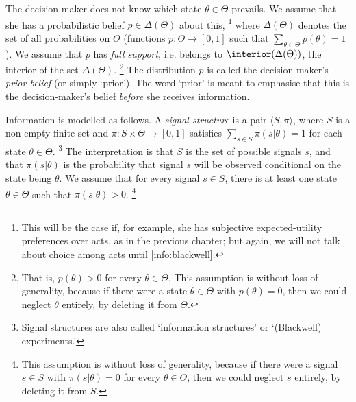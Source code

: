 The decision-maker does not know which state $\theta \in \Theta$ prevails. We assume that she has a probabilistic belief $p \in \Delta(\Theta)$ about this,%
	\footnote{This will be the case if, for example, she has subjective expected-utility preferences over acts, as in the previous chapter; but again, we will not talk about choice among acts until \cref{info:blackwell}.}
where $\Delta(\Theta)$ denotes the set of all probabilities on $\Theta$ (functions $p : \Theta \to [0,1]$ such that $\sum_{\theta \in \Theta} p(\theta) = 1$). We assume that $p$ has \emph{full support}, i.e. belongs to $\interior(\Delta(\Theta))$, the interior of the set $\Delta(\Theta)$.%
	\footnote{That is, $p(\theta)>0$ for every $\theta \in \Theta$. This assumption is without loss of generality, because if there were a state $\theta \in \Theta$ with $p(\theta)=0$, then we could neglect $\theta$ entirely, by deleting it from $\Theta$.}
The distribution $p$ is called the decision-maker's \emph{prior belief} (or simply `prior'). The word `prior' is meant to emphasise that this is the decision-maker's belief \emph{before} she receives information.

Information is modelled as follows. A \emph{signal structure} is a pair $\langle S, \pi \rangle $, where $S$ is a non-empty finite set and $\pi : S \times \Theta \to [0,1]$ satisfies $\sum_{s \in S} \pi(s|\theta) = 1$ for each state $\theta \in \Theta$.%
	\footnote{Signal structures are also called `information structures' or `(Blackwell) experiments.'}
The interpretation is that $S$ is the set of possible signals $s$, and that $\pi(s|\theta)$ is the probability that signal $s$ will be observed conditional on the state being $\theta$. We assume that for every signal $s \in S$, there is at least one state $\theta \in \Theta$ such that $\pi(s|\theta)>0$.%
	\footnote{This assumption is without loss of generality, because if there were a signal $s \in S$ with $\pi(s|\theta)=0$ for every $\theta \in \Theta$, then we could neglect $s$ entirely, by deleting it from $S$.}

